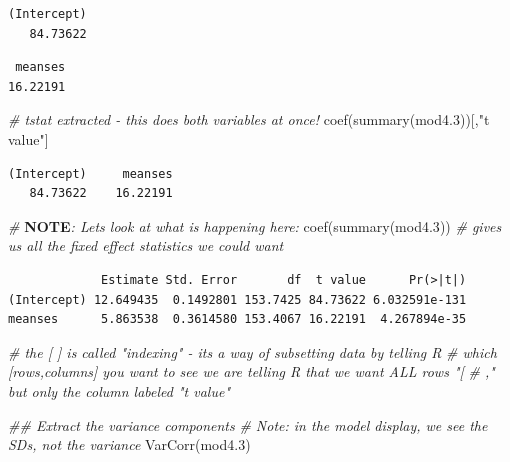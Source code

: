 \documentclass[
  letterpaper,
  DIV=11,
  numbers=noendperiod]{scrreprt}
\newenvironment{Shaded}{\begin{snugshade}}{\end{snugshade}}
\newcommand{\AlertTok}[1]{\textcolor[rgb]{1.00,0.00,0.00}{\textbf{#1}}}
\newcommand{\CommentTok}[1]{\textcolor[rgb]{0.38,0.63,0.69}{\textit{#1}}}
\newcommand{\DecValTok}[1]{\textcolor[rgb]{0.25,0.63,0.44}{#1}}
\newcommand{\DocumentationTok}[1]{\textcolor[rgb]{0.73,0.13,0.13}{\textit{#1}}}
\newcommand{\FloatTok}[1]{\textcolor[rgb]{0.25,0.63,0.44}{#1}}
\newcommand{\FunctionTok}[1]{\textcolor[rgb]{0.02,0.16,0.49}{#1}}
\newcommand{\NormalTok}[1]{\textcolor[rgb]{0.00,0.44,0.13}{#1}}
\newcommand{\SpecialCharTok}[1]{\textcolor[rgb]{0.25,0.44,0.63}{#1}}
\newcommand{\StringTok}[1]{\textcolor[rgb]{0.25,0.44,0.63}{#1}}
\begin{document}
\begin{verbatim}
(Intercept) 
   84.73622 
\end{verbatim}

\begin{Shaded}
\end{Shaded}

\begin{verbatim}
 meanses 
16.22191 
\end{verbatim}

\begin{Shaded}
\begin{Highlighting}[]
\CommentTok{\# tstat extracted {-} this does both variables at once! }
\FunctionTok{coef}\NormalTok{(}\FunctionTok{summary}\NormalTok{(mod4}\FloatTok{.3}\NormalTok{))[,}\StringTok{"t value"}\NormalTok{]}
\end{Highlighting}
\end{Shaded}

\begin{verbatim}
(Intercept)     meanses 
   84.73622    16.22191 
\end{verbatim}

\begin{Shaded}
\begin{Highlighting}[]
\CommentTok{\# }\AlertTok{NOTE}\CommentTok{: Let\textquotesingle{}s look at what is happening here:}
\FunctionTok{coef}\NormalTok{(}\FunctionTok{summary}\NormalTok{(mod4}\FloatTok{.3}\NormalTok{)) }\CommentTok{\# gives us all the fixed effect statistics we could want}
\end{Highlighting}
\end{Shaded}

\begin{verbatim}
             Estimate Std. Error       df  t value      Pr(>|t|)
(Intercept) 12.649435  0.1492801 153.7425 84.73622 6.032591e-131
meanses      5.863538  0.3614580 153.4067 16.22191  4.267894e-35
\end{verbatim}

\begin{Shaded}
\begin{Highlighting}[]
\CommentTok{\# the [ ] is called "indexing" {-} it\textquotesingle{}s a way of subsetting data by telling R}
\CommentTok{\# which [rows,columns] you want to see we are telling R that we want ALL rows "[}
\CommentTok{\# ," but only the column labeled "t value"}

\DocumentationTok{\#\# Extract the variance components}
\CommentTok{\# Note: in the model display, we see the SDs, not the variance}
\FunctionTok{VarCorr}\NormalTok{(mod4}\FloatTok{.3}\NormalTok{)}
\end{Highlighting}
\end{Shaded}
\end{document}
